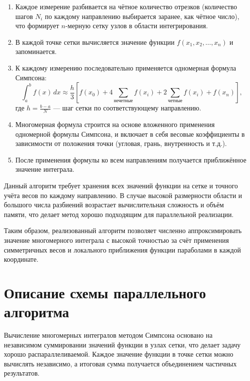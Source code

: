 \documentclass[14pt,a4paper]{extarticle}
\begin{document}
\begin{enumerate}
    \item Каждое измерение разбивается на чётное количество отрезков (количество шагов $N_i$ по каждому направлению выбирается заранее, как чётное число), что формирует $n$-мерную сетку узлов в области интегрирования.

    \item В каждой точке сетки вычисляется значение функции $f(x_1, x_2,\dots, x_n)$ и запоминается.

    \item К каждому измерению последовательно применяется одномерная формула Симпсона:
    $$\int_a^b f(x)\,dx \approx \frac{h}{3}\left[f(x_0) + 4 \sum_{\text{нечетные}} f(x_i) + 2 \sum_{\text{четные}} f(x_i) + f(x_n)\right],$$
    где $h = \frac{b - a}{N}$ — шаг сетки по соответствующему направлению.

    \item Многомерная формула строится на основе вложенного применения одномерной формулы Симпсона, и включает в себя весовые коэффициенты в зависимости от положения точки (угловая, грань, внутренность и т.д.).

    \item После применения формулы ко всем направлениям получается приближённое значение интеграла.
\end{enumerate}

Данный алгоритм требует хранения всех значений функции на сетке и точного учёта весов по каждому направлению. В случае высокой размерности области и большого числа разбиений возрастает вычислительная сложность и объём памяти, что делает метод хорошо подходящим для параллельной реализации.

Таким образом, реализованный алгоритм позволяет численно аппроксимировать значение многомерного интеграла с высокой точностью за счёт применения симметричных весов и локального приближения функции параболами в каждой координате.

\section{Описание схемы параллельного алгоритма}

Вычисление многомерных интегралов методом Симпсона основано на независимом суммировании значений функции в узлах сетки, что делает задачу хорошо распараллеливаемой. Каждое значение функции в точке сетки можно вычислять независимо, а итоговая сумма получается объединением частичных результатов.
\end{document}
